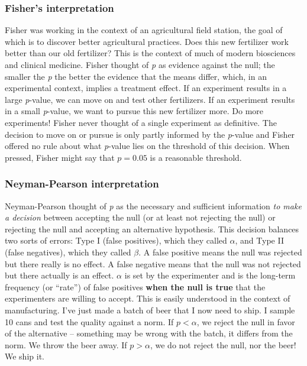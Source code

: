 \documentclass[]{book}
\begin{document}
\hypertarget{fishers-interpretation}{%
\subsubsection{Fisher's interpretation}\label{fishers-interpretation}}

Fisher was working in the context of an agricultural field station, the goal of which is to discover better agricultural practices. Does this new fertilizer work better than our old fertilizer? This is the context of much of modern biosciences and clinical medicine. Fisher thought of \emph{p} as evidence against the null; the smaller the \emph{p} the better the evidence that the means differ, which, in an experimental context, implies a treatment effect. If an experiment results in a large \emph{p}-value, we can move on and test other fertilizers. If an experiment results in a small \emph{p}-value, we want to pursue this new fertilizer more. Do more experiments! Fisher never thought of a single experiment as definitive. The decision to move on or pursue is only partly informed by the \emph{p}-value and Fisher offered no rule about what \emph{p}-value lies on the threshold of this decision. When pressed, Fisher might say that \(p=0.05\) is a reasonable threshold.

\hypertarget{neyman-pearson-interpretation}{%
\subsubsection{Neyman-Pearson interpretation}\label{neyman-pearson-interpretation}}

Neyman-Pearson thought of \emph{p} as the necessary and sufficient information \emph{to make a decision} between accepting the null (or at least not rejecting the null) or rejecting the null and accepting an alternative hypothesis. This decision balances two sorts of errors: Type I (false positives), which they called \(\alpha\), and Type II (false negatives), which they called \(\beta\). A false positive means the null was rejected but there really is no effect. A false negative means that the null was not rejected but there actually is an effect. \(\alpha\) is set by the experimenter and is the long-term frequency (or ``rate'') of false positives \textbf{when the null is true} that the experimenters are willing to accept. This is easily understood in the context of manufacturing. I've just made a batch of beer that I now need to ship. I sample 10 cans and test the quality against a norm. If \(p < \alpha\), we reject the null in favor of the alternative -- something may be wrong with the batch, it differs from the norm. We throw the beer away. If \(p > \alpha\), we do not reject the null, nor the beer! We ship it.
\end{document}
